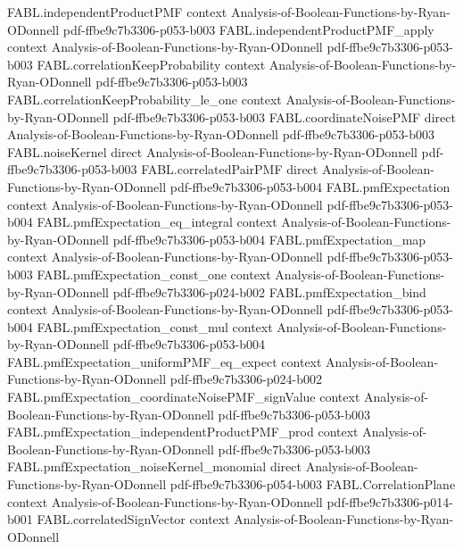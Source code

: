 \begin{theorem}
\proofstep
  {FABL.independentProductPMF}
  {context}
  {Analysis-of-Boolean-Functions-by-Ryan-ODonnell}
  {pdf-ffbe9c7b3306-p053-b003}
\proofstep
  {FABL.independentProductPMF_apply}
  {context}
  {Analysis-of-Boolean-Functions-by-Ryan-ODonnell}
  {pdf-ffbe9c7b3306-p053-b003}
\proofstep
  {FABL.correlationKeepProbability}
  {context}
  {Analysis-of-Boolean-Functions-by-Ryan-ODonnell}
  {pdf-ffbe9c7b3306-p053-b003}
\proofstep
  {FABL.correlationKeepProbability_le_one}
  {context}
  {Analysis-of-Boolean-Functions-by-Ryan-ODonnell}
  {pdf-ffbe9c7b3306-p053-b003}
\proofstep
  {FABL.coordinateNoisePMF}
  {direct}
  {Analysis-of-Boolean-Functions-by-Ryan-ODonnell}
  {pdf-ffbe9c7b3306-p053-b003}
\proofstep
  {FABL.noiseKernel}
  {direct}
  {Analysis-of-Boolean-Functions-by-Ryan-ODonnell}
  {pdf-ffbe9c7b3306-p053-b003}
\proofstep
  {FABL.correlatedPairPMF}
  {direct}
  {Analysis-of-Boolean-Functions-by-Ryan-ODonnell}
  {pdf-ffbe9c7b3306-p053-b004}
\proofstep
  {FABL.pmfExpectation}
  {context}
  {Analysis-of-Boolean-Functions-by-Ryan-ODonnell}
  {pdf-ffbe9c7b3306-p053-b004}
\proofstep
  {FABL.pmfExpectation_eq_integral}
  {context}
  {Analysis-of-Boolean-Functions-by-Ryan-ODonnell}
  {pdf-ffbe9c7b3306-p053-b004}
\proofstep
  {FABL.pmfExpectation_map}
  {context}
  {Analysis-of-Boolean-Functions-by-Ryan-ODonnell}
  {pdf-ffbe9c7b3306-p053-b003}
\proofstep
  {FABL.pmfExpectation_const_one}
  {context}
  {Analysis-of-Boolean-Functions-by-Ryan-ODonnell}
  {pdf-ffbe9c7b3306-p024-b002}
\proofstep
  {FABL.pmfExpectation_bind}
  {context}
  {Analysis-of-Boolean-Functions-by-Ryan-ODonnell}
  {pdf-ffbe9c7b3306-p053-b004}
\proofstep
  {FABL.pmfExpectation_const_mul}
  {context}
  {Analysis-of-Boolean-Functions-by-Ryan-ODonnell}
  {pdf-ffbe9c7b3306-p053-b004}
\proofstep
  {FABL.pmfExpectation_uniformPMF_eq_expect}
  {context}
  {Analysis-of-Boolean-Functions-by-Ryan-ODonnell}
  {pdf-ffbe9c7b3306-p024-b002}
\proofstep
  {FABL.pmfExpectation_coordinateNoisePMF_signValue}
  {context}
  {Analysis-of-Boolean-Functions-by-Ryan-ODonnell}
  {pdf-ffbe9c7b3306-p053-b003}
\proofstep
  {FABL.pmfExpectation_independentProductPMF_prod}
  {context}
  {Analysis-of-Boolean-Functions-by-Ryan-ODonnell}
  {pdf-ffbe9c7b3306-p053-b003}
\proofstep
  {FABL.pmfExpectation_noiseKernel_monomial}
  {direct}
  {Analysis-of-Boolean-Functions-by-Ryan-ODonnell}
  {pdf-ffbe9c7b3306-p054-b003}
\proofstep
  {FABL.CorrelationPlane}
  {context}
  {Analysis-of-Boolean-Functions-by-Ryan-ODonnell}
  {pdf-ffbe9c7b3306-p014-b001}
\proofstep
  {FABL.correlatedSignVector}
  {context}
  {Analysis-of-Boolean-Functions-by-Ryan-ODonnell}

\end{theorem}

